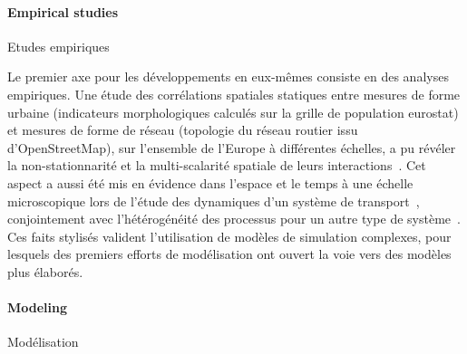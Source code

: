\paragraph{Empirical studies}{Etudes empiriques}

Le premier axe pour les développements en eux-mêmes consiste en des analyses empiriques. Une étude des corrélations spatiales statiques entre mesures de forme urbaine (indicateurs morphologiques calculés sur la grille de population eurostat) et mesures de forme de réseau (topologie du réseau routier issu d'OpenStreetMap), sur l'ensemble de l'Europe à différentes échelles, a pu révéler la non-stationnarité et la multi-scalarité spatiale de leurs interactions~\cite{raimbault2016cautious}. Cet aspect a aussi été mis en évidence dans l'espace et le temps à une échelle microscopique lors de l'étude des dynamiques d'un système de transport~\cite{raimbault2017investigating}, conjointement avec l'hétérogénéité des processus pour un autre type de système~\cite{raimbault2015hybrid}. Ces faits stylisés valident l'utilisation de modèles de simulation complexes, pour lesquels des premiers efforts de modélisation ont ouvert la voie vers des modèles plus élaborés.


\paragraph{Modeling}{Modélisation}

